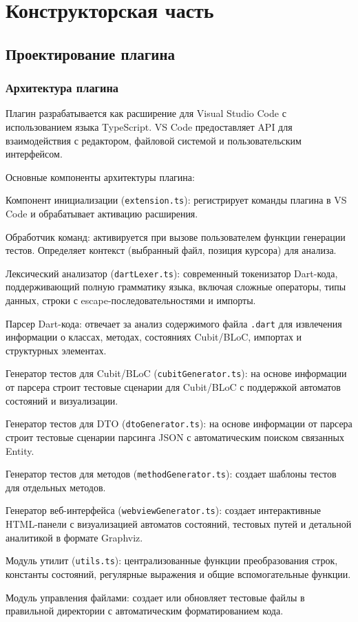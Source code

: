 \documentclass[14pt, russian]{scrartcl}
\begin{document}
\section{Конструкторская часть}

\subsection{Проектирование плагина}

\subsubsection{Архитектура плагина}
Плагин разрабатывается как расширение для Visual Studio Code с использованием языка TypeScript. VS Code предоставляет API для взаимодействия с редактором, файловой системой и пользовательским интерфейсом.

Основные компоненты архитектуры плагина:
\begin{itemize*}
    \item Компонент инициализации (\texttt{extension.ts}): регистрирует команды плагина в VS Code и обрабатывает активацию расширения.
    \item Обработчик команд: активируется при вызове пользователем функции генерации тестов. Определяет контекст (выбранный файл, позиция курсора) для анализа.
    \item Лексический анализатор (\texttt{dartLexer.ts}): современный токенизатор Dart-кода, поддерживающий полную грамматику языка, включая сложные операторы, типы данных, строки с escape-последовательностями и импорты.
    \item Парсер Dart-кода: отвечает за анализ содержимого файла \texttt{.dart} для извлечения информации о классах, методах, состояниях Cubit/BLoC, импортах и структурных элементах.
    \item Генератор тестов для Cubit/BLoC (\texttt{cubitGenerator.ts}): на основе информации от парсера строит тестовые сценарии для Cubit/BLoC с поддержкой автоматов состояний и визуализации.
    \item Генератор тестов для DTO (\texttt{dtoGenerator.ts}): на основе информации от парсера строит тестовые сценарии парсинга JSON с автоматическим поиском связанных Entity.
    \item Генератор тестов для методов (\texttt{methodGenerator.ts}): создает шаблоны тестов для отдельных методов.
    \item Генератор веб-интерфейса (\texttt{webviewGenerator.ts}): создает интерактивные HTML-панели с визуализацией автоматов состояний, тестовых путей и детальной аналитикой в формате Graphviz.
    \item Модуль утилит (\texttt{utils.ts}): централизованные функции преобразования строк, константы состояний, регулярные выражения и общие вспомогательные функции.
    \item Модуль управления файлами: создает или обновляет тестовые файлы в правильной директории с автоматическим форматированием кода.
\end{itemize*}
\end{document}

